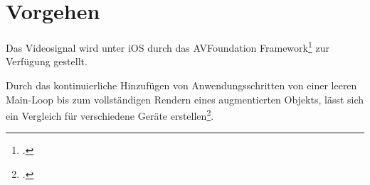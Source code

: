 \section{Vorgehen} %
\label{sec:vorgehen}
\begin{comment}
	Vorgehen: Analysemethoden vorstellen wie Algorithmen untersucht werden.
	Vergleich O-Notation
	Laufzeitanalyse
	Gleiche Kriterien (selbes Bild, selbes Video)
\end{comment}


Das Videosignal wird unter iOS durch das AVFoundation Framework\footcite{avfoundation} zur Verfügung gestellt.

Durch das kontinuierliche Hinzufügen von Anwendungsschritten von einer leeren Main-Loop bis zum vollständigen Rendern
 eines augmentierten Objekts, lässt sich ein Vergleich für verschiedene Geräte erstellen\footcite[Vgl.][]{wagner09b}.

